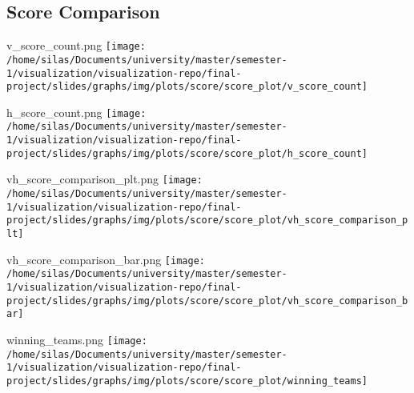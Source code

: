 \documentclass[pdf]{beamer}
\begin{document}
\subsection{Score Comparison}
\begin{frame}{v\_score\_count.png}
	\centering
	\texttt{[image: /home/silas/Documents/university/master/semester-1/visualization/visualization-repo/final-project/slides/graphs/img/plots/score/score\_plot/v\_score\_count]}
\end{frame}
\begin{frame}{h\_score\_count.png}
	\centering
	\texttt{[image: /home/silas/Documents/university/master/semester-1/visualization/visualization-repo/final-project/slides/graphs/img/plots/score/score\_plot/h\_score\_count]}
\end{frame}
\begin{frame}{vh\_score\_comparison\_plt.png}
	\centering
	\texttt{[image: /home/silas/Documents/university/master/semester-1/visualization/visualization-repo/final-project/slides/graphs/img/plots/score/score\_plot/vh\_score\_comparison\_plt]}
\end{frame}
\begin{frame}{vh\_score\_comparison\_bar.png}
	\centering
	\texttt{[image: /home/silas/Documents/university/master/semester-1/visualization/visualization-repo/final-project/slides/graphs/img/plots/score/score\_plot/vh\_score\_comparison\_bar]}
\end{frame}
\begin{frame}{winning\_teams.png}
	\centering
	\texttt{[image: /home/silas/Documents/university/master/semester-1/visualization/visualization-repo/final-project/slides/graphs/img/plots/score/score\_plot/winning\_teams]}
\end{frame}
\end{document}
